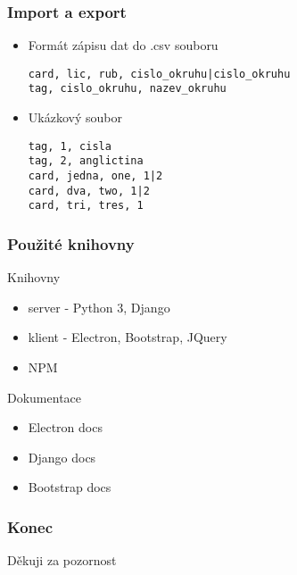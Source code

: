 \documentclass[11pt, xcolor=table]{beamer}
\begin{document}
    \begin{frame}[fragile]
        \frametitle{Import a export}
        \begin{itemize}
            \item Formát zápisu dat do .csv souboru
            \begin{lstlisting}
card, lic, rub, cislo_okruhu|cislo_okruhu
tag, cislo_okruhu, nazev_okruhu
            \end{lstlisting}
            \vfill
            \item Ukázkový soubor
            \begin{lstlisting}
tag, 1, cisla
tag, 2, anglictina
card, jedna, one, 1|2
card, dva, two, 1|2
card, tri, tres, 1
            \end{lstlisting}
        \end{itemize}
    \end{frame}
    \begin{frame}
        \frametitle{Použité knihovny}
        Knihovny
        \begin{itemize}
            \item server - Python 3, Django
            \item klient - Electron, Bootstrap, JQuery
            \item NPM
        \end{itemize}
        Dokumentace
        \begin{itemize}
            \item Electron docs
            \item Django docs
            \item Bootstrap docs
        \end{itemize}
    \end{frame}
    \begin{frame}
        \frametitle{Konec}
        \begin{block}{}
            \centering
            {\Huge Děkuji za pozornost}
        \end{block}
    \end{frame}
\end{document}
